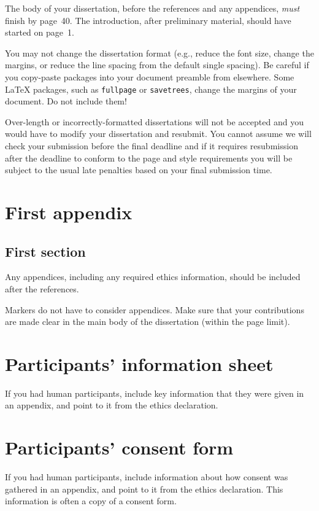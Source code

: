 \documentclass[logo,bsc,singlespacing,parskip]{infthesis}
\begin{document}
The body of your dissertation, before the references and any appendices,
\emph{must} finish by page~40. The introduction, after preliminary material,
should have started on page~1.

You may not change the dissertation format (e.g., reduce the font size, change
the margins, or reduce the line spacing from the default single spacing). Be
careful if you copy-paste packages into your document preamble from elsewhere.
Some \LaTeX{} packages, such as \texttt{fullpage} or \texttt{savetrees}, change
the margins of your document. Do not include them!

Over-length or incorrectly-formatted dissertations will not be accepted and you
would have to modify your dissertation and resubmit. You cannot assume we will
check your submission before the final deadline and if it requires resubmission
after the deadline to conform to the page and style requirements you will be
subject to the usual late penalties based on your final submission time.

% 




\appendix

\chapter{First appendix}

\section{First section}

Any appendices, including any required ethics information, should be included
after the references.

Markers do not have to consider appendices. Make sure that your contributions
are made clear in the main body of the dissertation (within the page limit).

\chapter{Participants' information sheet}

If you had human participants, include key information that they were given in
an appendix, and point to it from the ethics declaration.

\chapter{Participants' consent form}

If you had human participants, include information about how consent was
gathered in an appendix, and point to it from the ethics declaration.
This information is often a copy of a consent form.
\end{document}
